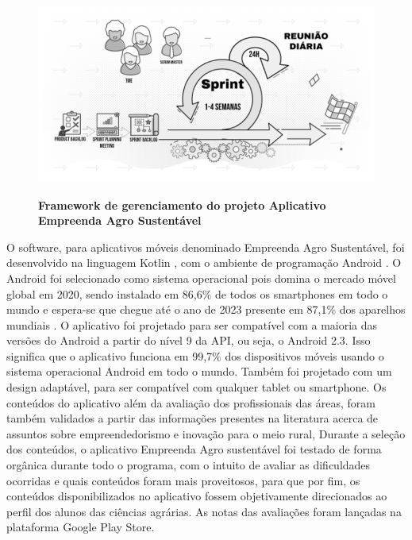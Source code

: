 \begin{figure}[H]
\centering
\caption{\textbf{Framework de gerenciamento do projeto Aplicativo Empreenda Agro Sustentável }}
\includegraphics[scale=0.1]{Imagens/scrum.png}
\label{figura_47}
\end{figure}

O software, para aplicativos móveis denominado Empreenda Agro Sustentável, foi desenvolvido na linguagem Kotlin \cite{smyth_kotlinandroid_2017}, com o ambiente de programação Android \cite{android_conheco_2019}. O Android foi selecionado como sistema operacional pois domina o mercado móvel global em 2020, sendo instalado em 86,6\% de todos os smartphones em todo o mundo e espera-se que chegue até o ano de 2023 presente em 87,1\% dos aparelhos mundiais \cite{idc_idc_2020}. 
O aplicativo foi projetado para ser compatível com a maioria das versões do Android a partir do nível 9 da API, ou seja, o Android 2.3. Isso significa que o aplicativo funciona em 99,7\% dos dispositivos móveis usando o sistema operacional Android em todo o mundo. Também foi projetado com um design adaptável, para ser compatível com qualquer tablet ou smartphone. 
Os conteúdos do aplicativo além da avaliação dos profissionais das áreas, foram também validados a partir das informações presentes na literatura acerca de assuntos sobre empreendedorismo e inovação para o meio rural, \cite{melo_sebrae_2008, oliveira_perfil_2006}
Durante a seleção dos conteúdos, o aplicativo Empreenda Agro sustentável foi testado de forma orgânica durante todo o programa, com o intuito de avaliar as dificuldades ocorridas e quais conteúdos foram mais proveitosos, para que por fim, os conteúdos disponibilizados no aplicativo fossem objetivamente direcionados ao perfil dos alunos das ciências agrárias. As notas das avaliações foram lançadas na plataforma Google Play Store. 

